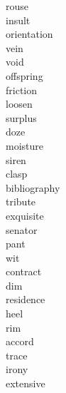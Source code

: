 \documentclass[a4paper, 11pt]{ctexart}
\begin{document}
\begin{multicols*}{3}
\begin{description}
\item[rouse]

\item[insult]

\item[orientation]

\item[vein]

\item[void]

\item[offspring]

\item[friction]

\item[loosen]

\item[surplus]

\item[doze]

\item[moisture]

\item[siren]

\item[clasp]

\item[bibliography]

\item[tribute]

\item[exquisite]

\item[senator]

\item[pant]

\item[wit]

\item[contract]

\item[dim]

\item[residence]

\item[heel]

\item[rim]

\item[accord]

\item[trace]

\item[irony]

\item[extensive]


\end{description}
\end{multicols*}
\end{document}
